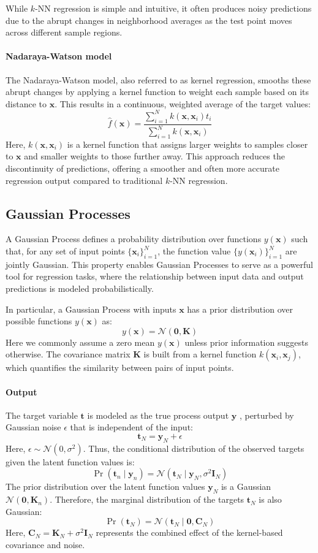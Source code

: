 While $k$-NN regression is simple and intuitive, it often produces noisy predictions due to the abrupt changes in neighborhood averages as the test point moves across different sample regions.

\paragraph*{Nadaraya-Watson model}
The Nadaraya-Watson model, also referred to as kernel regression, smooths these abrupt changes by applying a kernel function to weight each sample based on its distance to $\mathbf{x}$. 
This results in a continuous, weighted average of the target values:
\[\hat{f}(\mathbf{x})=\dfrac{\sum_{i=1}^N k(\mathbf{x},\mathbf{x}_i)t_i}{\sum_{i=1}^N k(\mathbf{x},\mathbf{x}_i)}\]
Here, $k(\mathbf{x},\mathbf{x}_i)$ is a kernel function that assigns larger weights to samples closer to $\mathbf{x}$ and smaller weights to those further away.
This approach reduces the discontinuity of predictions, offering a smoother and often more accurate regression output compared to traditional $k$-NN regression.

\subsection{Gaussian Processes}
A Gaussian Process defines a probability distribution over functions $y(\mathbf{x})$  such that, for any set of input points $\{\mathbf{x}_i\}_{i=1}^{N}$, the function value $\{y(\mathbf{x}_i)\}_{i=1}^{N}$ are jointly Gaussian.
This property enables Gaussian Processes to serve as a powerful tool for regression tasks, where the relationship between input data and output predictions is modeled probabilistically.
 
In particular, a Gaussian Process with inputs $\mathbf{x}$ has a prior distribution over possible functions $y(\mathbf{x})$ as:
\[y(\mathbf{x})=\mathcal{N}(\mathbf{0},\mathbf{K})\]
Here we commonly assume a zero mean $y(\mathbf{x})$ unless prior information suggests otherwise.
The covariance matrix $\mathbf{K}$ is built from a kernel function $k(\mathbf{x}_i,\mathbf{x}_j)$, which quantifies the similarity between pairs of input points.  

\paragraph*{Output}
The target variable $\mathbf{t}$ is modeled as the true process output $\mathbf{y}$ , perturbed by Gaussian noise $\epsilon$ that is independent of the input:
\[\mathbf{t}_N=\mathbf{y}_N+\epsilon\]
Here, $\epsilon\sim\mathcal{N}(0,\sigma^2)$. 
Thus, the conditional distribution of the observed targets given the latent function values is:
\[\Pr(\mathbf{t}_n\mid\mathbf{y}_n)=\mathcal{N}(\mathbf{t}_N\mid\mathbf{y}_N,\sigma^2\mathbf{I}_N)\]
The prior distribution over the latent function values $\mathbf{y}_N$ is a Gaussian $\mathcal{N}(\mathbf{0},\mathbf{K}_n)$. 
Therefore, the marginal distribution of the targets $\mathbf{t}_N$ is also Gaussian:
\[\Pr(\mathbf{t}_N)=\mathcal{N}(\mathbf{t}_N\mid\mathbf{0},\mathbf{C}_N)\]
Here, $\mathbf{C}_N=\mathbf{K}_N+\sigma^2\mathbf{I}_N$ represents the combined effect of the kernel-based covariance and noise.

